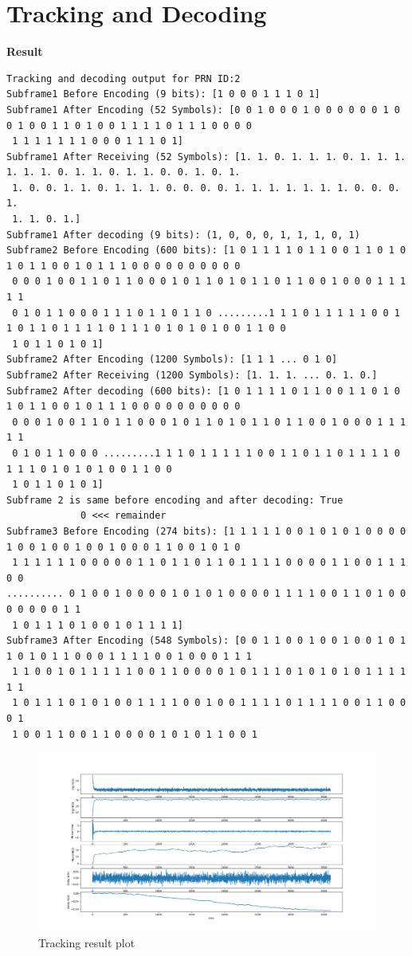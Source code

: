 \section{Tracking and Decoding}
\textbf{Result}
\begin{lstlisting}
Tracking and decoding output for PRN ID:2
Subframe1 Before Encoding (9 bits): [1 0 0 0 1 1 1 0 1]
Subframe1 After Encoding (52 Symbols): [0 0 1 0 0 0 1 0 0 0 0 0 0 1 0 0 1 0 0 1 1 0 1 0 0 1 1 1 1 0 1 1 1 0 0 0 0
 1 1 1 1 1 1 1 0 0 0 1 1 1 0 1]
Subframe1 After Receiving (52 Symbols): [1. 1. 0. 1. 1. 1. 0. 1. 1. 1. 1. 1. 1. 0. 1. 1. 0. 1. 1. 0. 0. 1. 0. 1.
 1. 0. 0. 1. 1. 0. 1. 1. 1. 0. 0. 0. 0. 1. 1. 1. 1. 1. 1. 1. 0. 0. 0. 1.
 1. 1. 0. 1.]
Subframe1 After decoding (9 bits): (1, 0, 0, 0, 1, 1, 1, 0, 1)
Subframe2 Before Encoding (600 bits): [1 0 1 1 1 1 0 1 1 0 0 1 1 0 1 0 1 0 1 1 0 0 1 0 1 1 1 0 0 0 0 0 0 0 0 0 0
 0 0 0 1 0 0 1 1 0 1 1 0 0 0 1 0 1 1 0 1 0 1 1 0 1 1 0 0 1 0 0 0 1 1 1 1 1
 0 1 0 1 1 0 0 0 1 1 1 0 1 1 0 1 1 0 .........1 1 1 0 1 1 1 1 1 0 0 1 1 0 1 1 0 1 1 1 1 0 1 1 1 0 1 0 1 0 1 0 0 1 1 0 0
 1 0 1 1 0 1 0 1]
Subframe2 After Encoding (1200 Symbols): [1 1 1 ... 0 1 0]
Subframe2 After Receiving (1200 Symbols): [1. 1. 1. ... 0. 1. 0.]
Subframe2 After decoding (600 bits): [1 0 1 1 1 1 0 1 1 0 0 1 1 0 1 0 1 0 1 1 0 0 1 0 1 1 1 0 0 0 0 0 0 0 0 0 0
 0 0 0 1 0 0 1 1 0 1 1 0 0 0 1 0 1 1 0 1 0 1 1 0 1 1 0 0 1 0 0 0 1 1 1 1 1
 0 1 0 1 1 0 0 0 .........1 1 1 0 1 1 1 1 1 0 0 1 1 0 1 1 0 1 1 1 1 0 1 1 1 0 1 0 1 0 1 0 0 1 1 0 0
 1 0 1 1 0 1 0 1]
Subframe 2 is same before encoding and after decoding: True
             0 <<< remainder
Subframe3 Before Encoding (274 bits): [1 1 1 1 1 0 0 1 0 1 0 1 0 0 0 0 1 0 0 1 0 0 1 0 0 1 0 0 0 1 1 0 0 1 0 1 0
 1 1 1 1 1 1 0 0 0 0 0 1 1 0 1 1 0 1 1 0 1 1 1 1 0 0 0 0 1 1 0 0 1 1 1 0 0
.......... 0 1 0 0 1 0 0 0 0 1 0 1 0 1 0 0 0 0 1 1 1 1 0 0 1 1 0 1 0 0 0 0 0 0 0 1 1
 1 0 1 1 1 0 1 0 0 1 0 1 1 1 1]
Subframe3 After Encoding (548 Symbols): [0 0 1 1 0 0 1 0 0 1 0 0 1 0 1 1 0 1 0 1 1 0 0 0 1 1 1 1 0 0 1 0 0 0 1 1 1
 1 1 0 0 1 0 1 1 1 1 1 0 0 1 1 0 0 0 0 1 0 1 1 1 0 1 0 1 0 1 0 1 1 1 1 1 1
 1 0 1 1 1 0 1 0 1 0 0 1 1 1 1 0 0 1 0 0 1 1 1 1 0 1 1 1 1 0 0 1 1 0 0 0 1
 1 0 0 1 1 0 0 1 1 0 0 0 0 1 0 1 0 1 1 0 0 1
\end{lstlisting}
\begin{normalsize}
\begin{figure}[ht]
\centering
\includegraphics[width=1\columnwidth]{figs/tracking_plot.png}
\centering
\captionsetup{justification=centering}
\caption{Tracking result plot}
\label{fig:tracking_plot}
\end{figure}
\end{normalsize}






